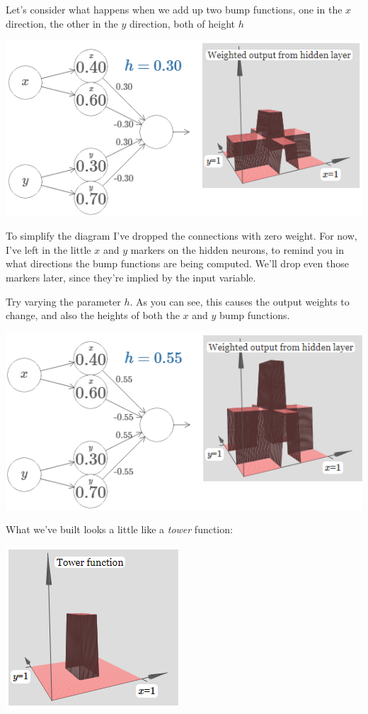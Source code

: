 Let's consider what happens when we add up two bump functions, one in the $x$
direction, the other in the $y$ direction, both of height $h$

{\centering \includegraphics[width=.7\textwidth,]{pic/wigglyfn30} \par}

To simplify the diagram I've dropped the connections with zero weight. For now, I've left in the little $x$ and $y$ markers on the hidden neurons, to remind you in what directions the bump functions are being computed. We'll drop even those markers later, since they're implied by the input variable.


Try varying the parameter $h$. As you can see, this causes the output weights to change, and also the heights of both the $x$ and $y$
bump functions.

{\centering \includegraphics[width=.7\textwidth,]{pic/wigglyfn31} \par}

What we've built looks a little like a \textit{tower} function:


{\centering \includegraphics[width=.5\textwidth,]{pic/wigglyfn32} \par}

